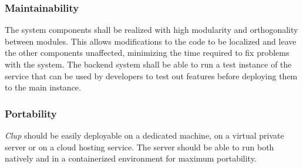\subsubsection{Maintainability}
The system components shall be realized with high modularity and orthogonality between modules. This allows modifications to the code to be localized and leave the other components unaffected, minimizing the time required to fix problems with the system.
The backend system shall be able to run a test instance of the service that can be used by developers to test out features before deploying them to the main instance.
\subsubsection{Portability}
\textit{Clup} should be easily deployable on a dedicated machine, on a virtual private server or on a cloud hosting service. The server should be able to run both natively and in a containerized environment for maximum portability.
